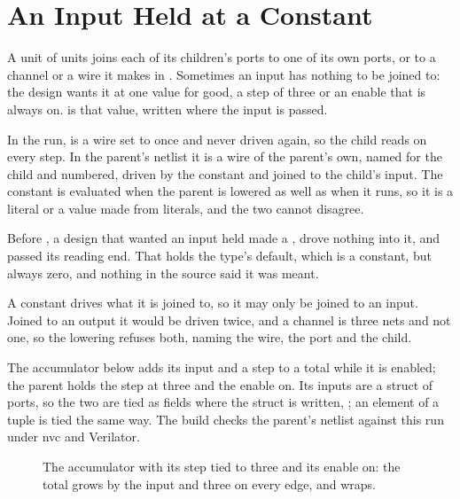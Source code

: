 \section{An Input Held at a Constant}
\label{sec:x-tie}

A unit of units joins each of its children's ports to one of its own
ports, or to a channel or a wire it makes in . Sometimes an
input has nothing to be joined to: the design wants it at one value
for good, a step of three or an enable that is always on.
 is that value, written where the input is passed.

In the run,  is a wire set to  once and never
driven again, so the child reads  on every step. In the
parent's netlist it is a wire of the parent's own, named for the
child and numbered, driven by the constant and joined to the child's
input. The constant is evaluated when the parent is lowered as well
as when it runs, so it is a literal or a value made from literals, and
the two cannot disagree.

Before , a design that wanted an input held made a
, drove nothing into it, and passed its reading end.
That holds the type's default, which is a constant, but always zero,
and nothing in the source said it was meant.

A constant drives what it is joined to, so it may only be joined to an
input. Joined to an output it would be driven twice, and a channel is
three nets and not one, so the lowering refuses both, naming the wire,
the port and the child.

The accumulator below adds its input and a step to a total while it
is enabled; the parent holds the step at three and the enable on. Its
inputs are a struct of ports, so the two are tied as fields where the
struct is written, ; an element of a tuple is
tied the same way. The
build checks the parent's netlist against this run under nvc and
Verilator.

\begin{figure}[htbp]
\centering

\caption{The accumulator with its step tied to three and its enable
on: the total grows by the input and three on every edge, and wraps.}
\label{fig:x-tie}
\end{figure}




